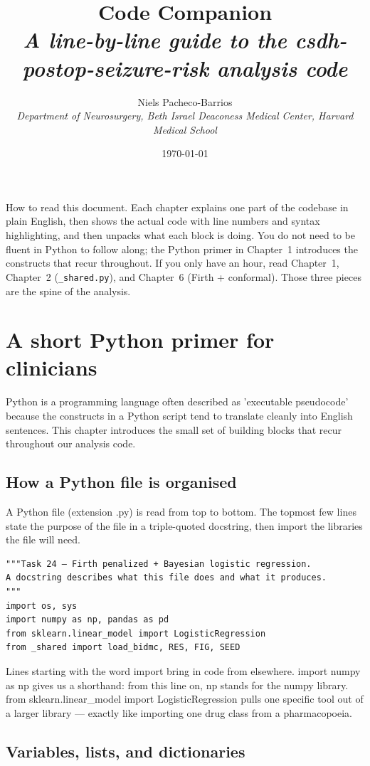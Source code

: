 \documentclass[11pt,a4paper]{article}
\title{\color{navy}\sffamily\Huge Code Companion \\[6pt]
  \Large\itshape A line-by-line guide to the csdh-postop-seizure-risk
  analysis code}
\author{\sffamily Niels Pacheco-Barrios \\[2pt]
  {\small\itshape Department of Neurosurgery, Beth Israel Deaconess
  Medical Center, Harvard Medical School}}
\date{\today}
\begin{document}
\maketitle

\begin{callout}{How to read this document.}
Each chapter explains one part of the codebase in plain English, then
shows the actual code with line numbers and syntax highlighting, and
then unpacks what each block is doing. You do not need to be fluent in
Python to follow along; the Python primer in Chapter~1 introduces the
constructs that recur throughout. If you only have an hour, read
Chapter~1, Chapter~2 (\texttt{\_shared.py}), and Chapter~6 (Firth +
conformal). Those three pieces are the spine of the analysis.
\end{callout}

\tableofcontents\clearpage
\section{A short Python primer for clinicians}
Python is a programming language often described as 'executable pseudocode' because the constructs in a Python script tend to translate cleanly into English sentences. This chapter introduces the small set of building blocks that recur throughout our analysis code.
\subsection{How a Python file is organised}
A Python file (extension .py) is read from top to bottom. The topmost few lines state the purpose of the file in a triple-quoted docstring, then import the libraries the file will need.

\begin{lstlisting}[style=codeblock]
"""Task 24 — Firth penalized + Bayesian logistic regression.
A docstring describes what this file does and what it produces.
"""
import os, sys
import numpy as np, pandas as pd
from sklearn.linear_model import LogisticRegression
from _shared import load_bidmc, RES, FIG, SEED
\end{lstlisting}

Lines starting with the word import bring in code from elsewhere. import numpy as np gives us a shorthand: from this line on, np stands for the numpy library. from sklearn.linear\_model import LogisticRegression pulls one specific tool out of a larger library --- exactly like importing one drug class from a pharmacopoeia.
\subsection{Variables, lists, and dictionaries}
\end{document}
